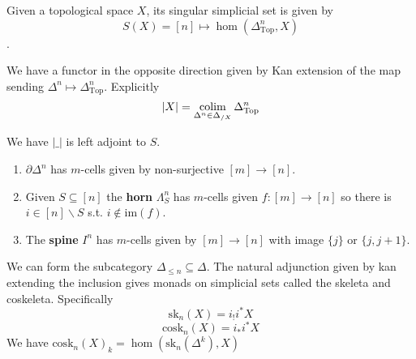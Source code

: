 \begin{definition}
    Given a topological space $X$, its singular simplicial set is given by 
    \[S(X) = [n] \mapsto \hom(\Delta^n_{\mathrm{Top}}, X)\].

    We have a functor in the opposite direction given by Kan extension of the map sending $\Delta^n \mapsto \Delta^n_{\mathrm{Top}}$.
    Explicitly
    \[ |X| = \colim_{\Delta^n \in \Delta_{/X}} \Delta^n_{\mathrm{Top}}\]

    We have $| \_ |$ is left adjoint to $S$.
\end{definition}

\begin{definition}
    \begin{enumerate}
        \item $\partial \Delta^n$ has $m$-cells given by non-surjective $[m] \to [n]$.
        \item Given $S \subseteq [n]$ the \textbf{horn} $\Lambda^n_S$ has $m$-cells given $f : [m] \to [n]$ so there is $i \in [n] \backslash S$ s.t. $i \notin \mathrm{im}(f)$.
        \item The \textbf{spine} $I^n$ has $m$-cells given by $[m] \to [n]$ with image $\{j\}$ or $\{j, j+1\}$.
    \end{enumerate}
\end{definition}

\begin{definition}
    We can form the subcategory $\Delta_{\leq n} \subseteq \Delta$.
    The natural adjunction given by kan extending the inclusion gives monads on simplicial sets called the skeleta and coskeleta.
    Specifically
    \[\mathrm{sk}_n(X) = i_! i^\ast X \]
    \[\mathrm{cosk}_n(X) = i_* i^\ast X \]
    We have $\mathrm{cosk}_n(X)_k = \hom(\mathrm{sk}_n(\Delta^k), X)$
\end{definition}



